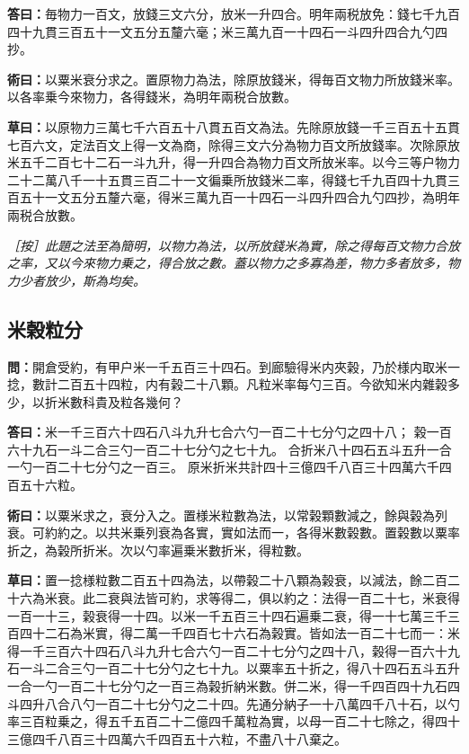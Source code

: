 \documentclass[11pt,a4paper]{article}
\newcommand{\Question}[1]{\par\noindent\textbf{\color{problemcolor}問：}#1\par}
\newcommand{\Answer}[1]{\par\noindent\textbf{\color{answercolor}答曰：}#1\par}
\newcommand{\Method}[1]{\par\noindent\textbf{\color{methodcolor}術曰：}#1\par}
\newcommand{\Working}[1]{\par\noindent\textbf{草曰：}#1\par}
\newcommand{\EditorialNote}[1]{\par\noindent\textit{［按］#1}\par}
\begin{document}
\Answer{毎物力一百文，放錢三文六分，放米一升四合。明年兩税放免：錢七千九百四十九貫三百五十一文五分五釐六毫；米三萬九百一十四石一斗四升四合九勺四抄。}

\Method{以粟米衰分求之。置原物力為法，除原放錢米，得毎百文物力所放錢米率。以各率乗今來物力，各得錢米，為明年兩税合放數。}

\Working{以原物力三萬七千六百五十八貫五百文為法。先除原放錢一千三百五十五貫七百六文，定法百文上得一文為商，除得三文六分為物力百文所放錢率。次除原放米五千二百七十二石一斗九升，得一升四合為物力百文所放米率。以今三等户物力二十二萬八千一十五貫三百二十一文徧乗所放錢米二率，得錢七千九百四十九貫三百五十一文五分五釐六毫，得米三萬九百一十四石一斗四升四合九勺四抄，為明年兩税合放數。}

\EditorialNote{此題之法至為簡明，以物力為法，以所放錢米為實，除之得每百文物力合放之率，又以今來物力乗之，得合放之數。蓋以物力之多寡為差，物力多者放多，物力少者放少，斯為均矣。}

\subsection*{\color{sectioncolor}米榖粒分}

\Question{開倉受約，有甲户米一千五百三十四石。到廊驗得米内夾榖，乃於様内取米一捻，數計二百五十四粒，内有榖二十八顆。凡粒米率每勺三百。今欲知米内雜榖多少，以折米數科貴及粒各幾何？}

\Answer{米一千三百六十四石八斗九升七合六勺一百二十七分勺之四十八；
榖一百六十九石一斗二合三勺一百二十七分勺之七十九。
合折米八十四石五斗五升一合一勺一百二十七分勺之一百三。
原米折米共計四十三億四千八百三十四萬六千四百五十六粒。}

\Method{以粟米求之，衰分入之。置様米粒數為法，以常榖顆數減之，餘與榖為列衰。可約約之。以共米乗列衰為各實，實如法而一，各得米數榖數。置榖數以粟率折之，為榖所折米。次以勺率遍乗米數折米，得粒數。}

\Working{置一捻様粒數二百五十四為法，以帶榖二十八顆為榖衰，以減法，餘二百二十六為米衰。此二衰與法皆可約，求等得二，俱以約之：法得一百二十七，米衰得一百一十三，榖衰得一十四。以米一千五百三十四石遍乗二衰，得一十七萬三千三百四十二石為米實，得二萬一千四百七十六石為榖實。皆如法一百二十七而一：米得一千三百六十四石八斗九升七合六勺一百二十七分勺之四十八，榖得一百六十九石一斗二合三勺一百二十七分勺之七十九。以粟率五十折之，得八十四石五斗五升一合一勺一百二十七分勺之一百三為榖折納米數。併二米，得一千四百四十九石四斗四升八合八勺一百二十七分勺之二十四。先通分納子一十八萬四千八十石，以勺率三百粒乗之，得五千五百二十二億四千萬粒為實，以母一百二十七除之，得四十三億四千八百三十四萬六千四百五十六粒，不盡八十八棄之。}
\end{document}
